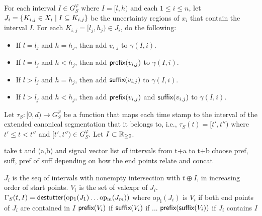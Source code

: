 For each interval $I \in G_S^\varphi$ where $I = [l,h)$ and each $1 \leq i \leq n$, let $J_i = \{ K_{i,j} \in X_i \st I \subseteq K_{i,j}\}$ be the uncertainty regions of $x_i$ that contain the interval $I$.
For each $K_{i,j} = [l_j, h_j) \in J_i$, do the following:
\begin{itemize}
	\item If $l = l_j$ and $h = h_j$, then add $v_{i,j}$ to $\gamma(I, i)$.
	\item If $l = l_j$ and $h < h_j$, then add $\textsf{prefix}(v_{i,j})$ to $\gamma(I,i)$.
	\item If $l > l_j$ and $h = h_j$, then add $\textsf{suffix}(v_{i,j})$ to $\gamma(I,i)$.
	\item If $l > l_j$ and $h < h_j$, then add $\textsf{prefix}(v_{i,j})$ and $\textsf{suffix}(v_{i,j})$ to $\gamma(I,i)$.
\end{itemize}

Let $\tau_S : [0,d) \to G_S^\varphi$ be a function that maps each time stamp to the interval of the extended canonical segmentation that it belongs to, i.e., $\tau_S(t) = [t', t'')$ where $t' \leq t < t''$ and $[t', t'') \in G_S^\varphi$.
Let $I \subset \mathbb{R}_{\geq 0}$.




take t and (a,b) and signal vector
list of intervals from t+a to t+b
choose pref, suff, pref of suff depending on how the end points relate and concat

$J_i$ is the seq of intervals with nonempty intersection with $t \oplus I$, in increasing order of start points.
$V_i$ is the set of valexpr of $J_i$.
$\Gamma_S(t, I) = \mathsf{destutter}(\operatorname{op_1}(J_1) \ldots \operatorname{op_m}(J_m))$ where $\operatorname{op_i}(J_i)$ is
$V_i$ if both end points of $J_i$ are contained in $I$
$\textsf{prefix}(V_i)$ if 
$\textsf{suffix}(V_i)$ if ...
$\textsf{prefix}(\textsf{suffix}(V_i))$ if $J_i$ contains $I$




